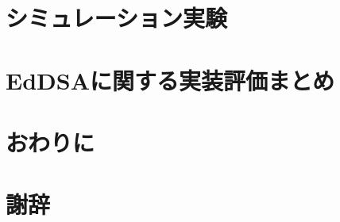 \documentclass[
  luatex,
  paper=a4paper,
  fontsize=11pt,
  report,
  jlreq_notes,
]{jlreq}
\begin{document}
\chapter[　　 シミュレーション実験]{シミュレーション実験}

\chapter[　　 EdDSAに関する実装評価まとめ]{EdDSAに関する実装評価まとめ}

\chapter*{おわりに}

\chapter*{謝辞}
% 


\end{document}
